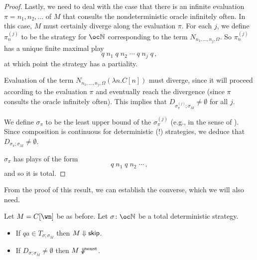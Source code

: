 \documentclass[sigplan,9pt,review]{acmart}\settopmatter{printfolios=true,printccs=false,printacmref=false}
\begin{document}
\begin{proof}
  Lastly, we need to deal with the case that there is an infinite evaluation $\pi = n_1,n_2,\dots$ of $M$ that consults the nondeterministic oracle infinitely often.
  In this case, $M$ must certainly diverge along the evaluation $\pi$.
  For each $j$, we define $\pi_n^{(j)}$ to be the strategy for $\oc \bN$ corresponding to the term $N_{n_1,\dots,n_j,\Omega}$.  
  So $\pi_n^{(j)}$ has a unique finite maximal play
  \[
    q\;n_1\;q\;n_2\;\cdots\;q\;n_j\;q\,,
    \]
  at which point the strategy has a partiality.  

  Evaluation of the term $N_{n_1,\dots,n_j,\Omega} (\lambda n.C[n])$ must diverge, since it will proceed according to the evaluation $\pi$ and eventually reach the divergence (since $\pi$ consults the oracle infinitely often).  
  This implies that $D_{\sigma_\pi^{(j)};\sigma_M}\ne\emptyset$ for all $j$.

  We define $\sigma_\pi$ to be the least upper bound of the $\sigma_\pi^{(j)}$ (e.g., in the sense of \cite{mcCHFiniteND}).  
  Since composition is continuous for deterministic (!) strategies, we deduce that $D_{\sigma_\pi;\sigma_M}\ne\emptyset$.

  $\sigma_\pi$ has plays of the form
  \[
    q\;n_1\;q\;n_2\;\cdots\,,
    \]
  and so it is total.
\end{proof}

From the proof of this result, we can establish the converse, which we will also need.

\begin{lemma}
  Let $M=C[\wn]$ be as before.
  Let $\sigma\from\oc\bN$ be a total deterministic strategy.
  \begin{itemize}
    \item If $qa\in T_{\sigma;\sigma_M}$ then $M\Downarrow{\mathsf{skip}}$.
    \item If $D_{\sigma;\sigma_M}\ne\emptyset$ then $M\not\Downarrow^{\text{must}}$.
  \end{itemize}
  \label{lem:soundness-converse}
\end{lemma}
\end{document}
